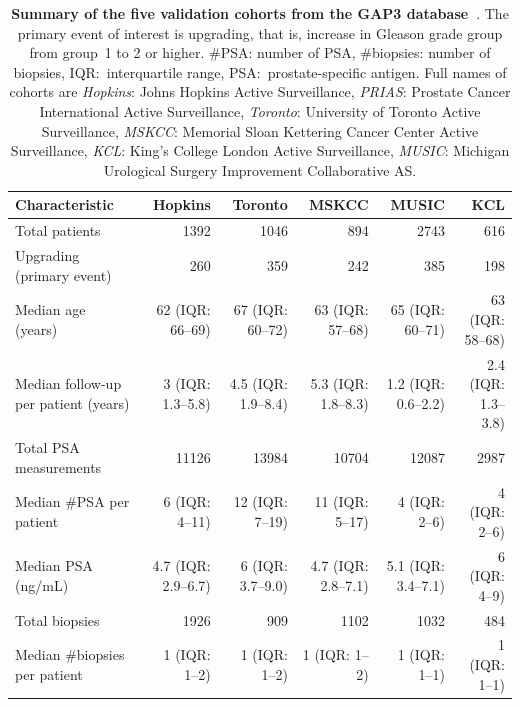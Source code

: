 \begin{landscape}
\begin{table}
\small\sf\centering
\caption{\textbf{Summary of the five validation cohorts from the GAP3 database~\citep{gap3_2018}}. The primary event of interest is upgrading, that is, increase in Gleason grade group from group~1 to 2 or higher. \#PSA: number of PSA, \#biopsies: number of biopsies, IQR:~interquartile range, PSA:~prostate-specific antigen. Full names of cohorts are \textit{Hopkins}: Johns Hopkins Active Surveillance, \textit{PRIAS}: Prostate Cancer International Active Surveillance, \textit{Toronto}: University of Toronto Active Surveillance, \textit{MSKCC}: Memorial Sloan Kettering Cancer Center Active Surveillance, \textit{KCL}: King's College London Active Surveillance, \textit{MUSIC}: Michigan Urological Surgery Improvement Collaborative AS.}
\label{table:gap3_summary}
\begin{tabular}{lrrrrr}
\hline
\textbf{Characteristic} & \textbf{Hopkins} & \textbf{Toronto} & \textbf{MSKCC} & \textbf{MUSIC} & \textbf{KCL}\\
\hline
Total patients & 1392 & 1046 & 894 &  2743 & 616\\
Upgrading (primary event) & 260 & 359 & 242 & 385 & 198\\
\hline
Median age (years) & 62 (IQR: 66--69) & 67 (IQR: 60--72) & 63 (IQR: 57--68) & 65 (IQR: 60--71) & 63 (IQR: 58--68)\\
Median follow-up per patient (years) &  3 (IQR: 1.3--5.8) & 4.5 (IQR: 1.9--8.4) & 5.3 (IQR: 1.8--8.3) & 1.2 (IQR: 0.6--2.2) & 2.4 (IQR: 1.3--3.8)\\
Total PSA measurements & 11126 & 13984 & 10704 & 12087 & 2987\\
Median \#PSA per patient &  6 (IQR: 4--11) & 12 (IQR: 7--19) & 11 (IQR: 5--17) & 4 (IQR: 2--6) & 4 (IQR: 2--6)\\
Median PSA (ng/mL) & 4.7 (IQR: 2.9--6.7) & 6 (IQR: 3.7--9.0) & 4.7 (IQR: 2.8--7.1) & 5.1 (IQR: 3.4--7.1) & 6 (IQR: 4--9)\\
Total biopsies & 1926 & 909 & 1102 & 1032 & 484\\
Median \#biopsies per patient &  1 (IQR: 1--2) &  1 (IQR: 1--2) &  1 (IQR: 1--2) & 1 (IQR: 1--1) & 1 (IQR: 1--1)\\
\hline
\end{tabular}
\end{table}
\end{landscape}

